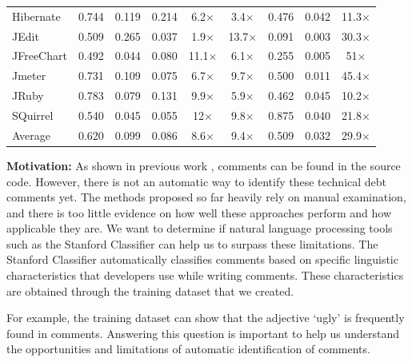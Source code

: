 \begin{table}[!thb]
\begin{center}
\begin{tabular}{l| c c c c c| c c c}
        Hibernate    &  0.744  & 0.119 & 0.214 &  6.2$\times$    &  3.4$\times$    & 0.476  &  0.042  & 11.3$\times$  \\
        JEdit        &  0.509  & 0.265 & 0.037 &  1.9$\times$    &  13.7$\times$   & 0.091  &  0.003  & 30.3$\times$  \\
        JFreeChart   &  0.492  & 0.044 & 0.080 &  11.1$\times$   &   6.1$\times$   & 0.255  &  0.005  & 51$\times$    \\
        Jmeter       &  0.731  & 0.109 & 0.075 &  6.7$\times$    &  9.7$\times$    & 0.500  &  0.011  & 45.4$\times$  \\
        JRuby        &  0.783  & 0.079 & 0.131 &  9.9$\times$    &  5.9$\times$    & 0.462  &  0.045  & 10.2$\times$  \\
        SQuirrel     &  0.540  & 0.045 & 0.055 &  12$\times$     & 9.8$\times$     & 0.875  &  0.040  & 21.8$\times$  \\
        \midrule 
        Average      &  0.620  & 0.099 & 0.086 &   8.6$\times$   & 9.4$\times$     & 0.509  &  0.032  & 29.9$\times$  \\ 
        \bottomrule
        \end{tabular}
    \end{center}    
\end{table}

\vspace{3mm}
\noindent\rqi
\vspace{3mm}

\noindent \textbf{Motivation:} As shown in previous work \cite{Potdar2014ICSME, Maldonado2015MTD}, \SATD comments can be found in the source code. However, there is not an automatic way to identify these technical debt comments yet. The methods proposed so far heavily rely on manual examination, and there is too little evidence on how well these approaches perform and how applicable they are. We want to determine if natural language processing tools such as the Stanford Classifier can help us to surpass these limitations. The Stanford Classifier automatically classifies comments based on specific linguistic characteristics that developers use while writing comments. These characteristics are obtained through the training dataset that we created. 

For example, the training dataset can show that the adjective `ugly' is frequently found in \SATD comments. Answering this question is important to help us understand the opportunities and limitations of automatic identification of \SATD comments. 

